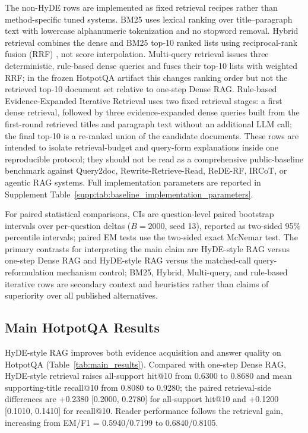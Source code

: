 The non-HyDE rows are implemented as fixed retrieval recipes rather than method-specific tuned systems. BM25 \cite{robertson2009probabilistic} uses lexical ranking over title--paragraph text with lowercase alphanumeric tokenization and no stopword removal. Hybrid retrieval combines the dense and BM25 top-10 ranked lists using reciprocal-rank fusion (RRF) \cite{cormack2009reciprocal}, not score interpolation. Multi-query retrieval issues three deterministic, rule-based dense queries and fuses their top-10 lists with weighted RRF; in the frozen HotpotQA artifact this changes ranking order but not the retrieved top-10 document set relative to one-step Dense RAG. Rule-based Evidence-Expanded Iterative Retrieval uses two fixed retrieval stages: a first dense retrieval, followed by three evidence-expanded dense queries built from the first-round retrieved titles and paragraph text without an additional LLM call; the final top-10 is a re-ranked union of the candidate documents. These rows are intended to isolate retrieval-budget and query-form explanations inside one reproducible protocol; they should not be read as a comprehensive public-baseline benchmark against Query2doc, Rewrite-Retrieve-Read, ReDE-RF, IRCoT, or agentic RAG systems. Full implementation parameters are reported in Supplement Table~\ref{supp:tab:baseline_implementation_parameters}.

For paired statistical comparisons, CIs are question-level paired bootstrap intervals over per-question deltas ($B=2000$, seed 13), reported as two-sided 95\% percentile intervals; paired EM tests use the two-sided exact McNemar test. The primary contrasts for interpreting the main claim are HyDE-style RAG versus one-step Dense RAG and HyDE-style RAG versus the matched-call query-reformulation mechanism control; BM25, Hybrid, Multi-query, and rule-based iterative rows are secondary context and heuristics rather than claims of superiority over all published alternatives.

\subsection{Main HotpotQA Results}
\label{sec:main_results}

HyDE-style RAG improves both evidence acquisition and answer quality on HotpotQA (Table~\ref{tab:main_results}). Compared with one-step Dense RAG, HyDE-style retrieval raises all-support hit@10 from 0.6300 to 0.8680 and mean supporting-title recall@10 from 0.8080 to 0.9280; the paired retrieval-side differences are +0.2380 [0.2000, 0.2780] for all-support hit@10 and +0.1200 [0.1010, 0.1410] for recall@10. Reader performance follows the retrieval gain, increasing from EM/F1 = 0.5940/0.7199 to 0.6840/0.8105.

